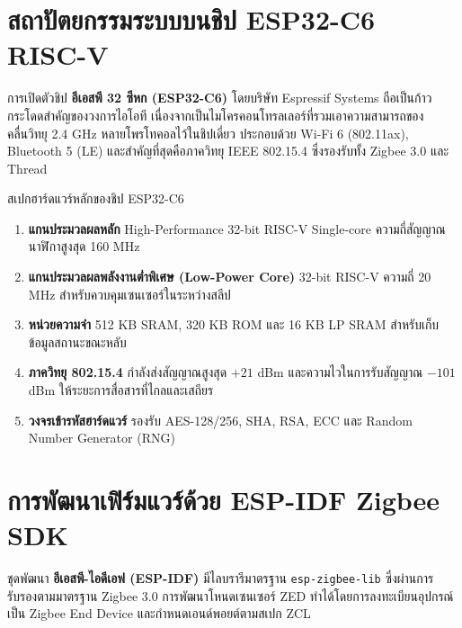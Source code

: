 \clearpage

\section{สถาปัตยกรรมระบบบนชิป ESP32-C6 RISC-V}

การเปิดตัวชิป \textbf{อีเอสพี 32 ซีหก (ESP32-C6)} โดยบริษัท Espressif Systems ถือเป็นก้าวกระโดดสำคัญของวงการไอโอที เนื่องจากเป็นไมโครคอนโทรลเลอร์ที่รวมเอาความสามารถของคลื่นวิทยุ 2.4 GHz หลายโพรโทคอลไว้ในชิปเดี่ยว ประกอบด้วย Wi-Fi 6 (802.11ax), Bluetooth 5 (LE) และสำคัญที่สุดคือภาควิทยุ IEEE 802.15.4 ซึ่งรองรับทั้ง Zigbee 3.0 และ Thread

\begin{protocolbox}
สเปกฮาร์ดแวร์หลักของชิป ESP32-C6
\begin{enumerate}
    \item \textbf{แกนประมวลผลหลัก} High-Performance 32-bit RISC-V Single-core ความถี่สัญญาณนาฬิกาสูงสุด 160 MHz
    \item \textbf{แกนประมวลผลพลังงานต่ำพิเศษ (Low-Power Core)} 32-bit RISC-V ความถี่ 20 MHz สำหรับควบคุมเซนเซอร์ในระหว่างสลีป
    \item \textbf{หน่วยความจำ} 512 KB SRAM, 320 KB ROM และ 16 KB LP SRAM สำหรับเก็บข้อมูลสถานะขณะหลับ
    \item \textbf{ภาควิทยุ 802.15.4} กำลังส่งสัญญาณสูงสุด $+21$ dBm และความไวในการรับสัญญาณ $-101$ dBm ให้ระยะการสื่อสารที่ไกลและเสถียร
    \item \textbf{วงจรเข้ารหัสฮาร์ดแวร์} รองรับ AES-128/256, SHA, RSA, ECC และ Random Number Generator (RNG)
\end{enumerate}
\end{protocolbox}

\section{การพัฒนาเฟิร์มแวร์ด้วย ESP-IDF Zigbee SDK}

ชุดพัฒนา \textbf{อีเอสพี-ไอดีเอฟ (ESP-IDF)} มีไลบรารีมาตรฐาน \texttt{esp-zigbee-lib} ซึ่งผ่านการรับรองตามมาตรฐาน Zigbee 3.0 การพัฒนาโหนดเซนเซอร์ ZED ทำได้โดยการลงทะเบียนอุปกรณ์เป็น Zigbee End Device และกำหนดเอนด์พอยต์ตามสเปก ZCL

